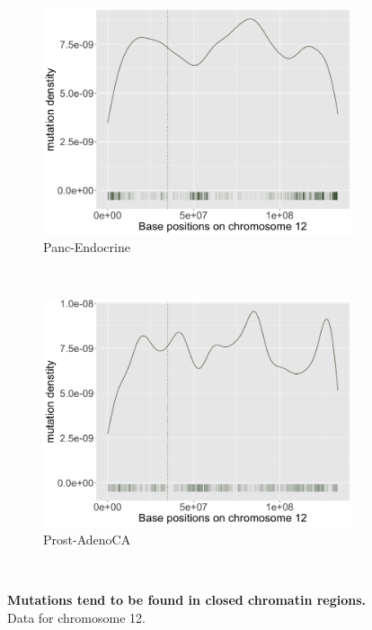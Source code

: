 \begin{figure}[h!]
    \begin{subfigure}{.5\textwidth}
    \includegraphics[width=\linewidth,height=0.6\textwidth]{graphics/mutdistribution_Panc-Endocrine.png}
    \caption{Panc-Endocrine}
    \end{subfigure} 
    ~
    \begin{subfigure}{.5\textwidth}
    \includegraphics[width=\linewidth,height=0.6\textwidth]{graphics/mutdistribution_Prost-AdenoCA.png}
    \caption{Prost-AdenoCA}
    \end{subfigure} \\

    \caption{\textbf{Mutations tend to be found in closed chromatin regions.} Data for chromosome 12.}
    \label{fig:apdx_mutation_density}
\end{figure}
